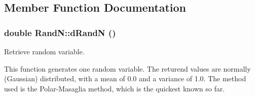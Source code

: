 \subsection{Member Function Documentation}
\subsubsection[dRandN]{\setlength{\rightskip}{0pt plus 5cm}double RandN::dRandN ()}\label{classRandN_0f821b3a122bbd285978503e504bd5f8}


Retrieve random variable. 

This function generates one random variable. The returend values are normally (Gaussian) distributed, with a mean of 0.0 and a variance of 1.0. The method used is the Polar-Masaglia method, which is the quickest known so far. 